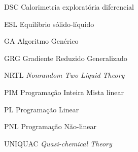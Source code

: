 
\begin{siglas}
    \item[DSC] Calorimetria exploratória diferencial
    \item[ESL] Equilíbrio sólido-líquido
    \item[GA] Algoritmo Genérico
    \item[GRG] Gradiente Reduzido Generalizado
    \item[NRTL] \textit{Nonrandom Two Liquid Theory}
    \item[PIM] Programação Inteira Mista linear
    \item[PL] Programação Linear
    \item[PNL] Programação Não-linear
    \item[UNIQUAC] \textit{Quasi-chemical Theory}
\end{siglas}


